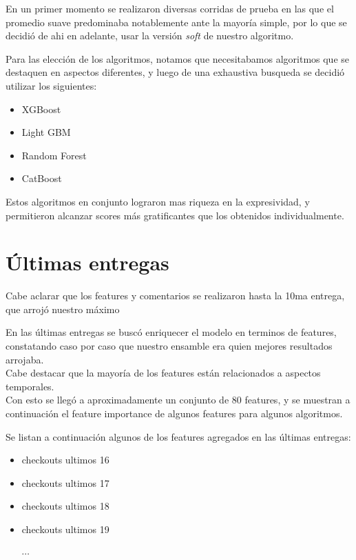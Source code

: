 \documentclass[a4paper ,12pt]{article}
\begin{document}
En un primer momento se realizaron diversas corridas de prueba en las que el promedio suave predominaba notablemente ante la mayoría simple, por lo que se decidió de ahi en adelante, usar la versión \textit{soft} de nuestro algoritmo.

Para las elección de los algoritmos, notamos que necesitabamos algoritmos que se destaquen en aspectos diferentes, y luego de una exhaustiva busqueda se decidió utilizar los siguientes:

\begin{itemize}
	\item XGBoost
	
	\item Light GBM
	
	\item Random Forest
	
	\item CatBoost

\end{itemize}

Estos algoritmos en conjunto lograron mas riqueza en la expresividad, y permitieron alcanzar scores más gratificantes que los obtenidos individualmente.

\newpage

\section{Últimas entregas}
	
	Cabe aclarar que los features y comentarios se realizaron hasta la 10ma entrega, que arrojó nuestro máximo
	
	
	En las últimas entregas se buscó enriquecer el modelo en terminos de features, constatando caso por caso que nuestro ensamble era quien mejores resultados arrojaba.\\
	
	Cabe destacar que la mayoría de los features están relacionados a aspectos temporales.\\
	
	Con esto se llegó a aproximadamente un conjunto de 80 features, y se muestran a continuación el feature importance de algunos features para algunos algoritmos.
	
	Se listan a continuación algunos de los features agregados en las últimas entregas:
	
	\begin{itemize}
		\item checkouts ultimos 16
		\item checkouts ultimos 17
		\item checkouts ultimos 18
		\item checkouts ultimos 19
		
		$\cdots$
	
	\end{itemize}
	
\end{document}
